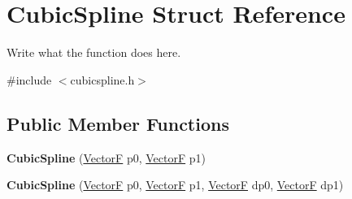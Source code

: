\hypertarget{structCubicSpline}{\section{Cubic\+Spline Struct Reference}
\label{structCubicSpline}
}


Write what the function does here.  




{\ttfamily \#include $<$cubicspline.\+h$>$}

\subsection*{Public Member Functions}
\begin{DoxyCompactItemize}
\item 
\hypertarget{structCubicSpline_ae9889650db27305852f896d03d3bd75c}{{\bfseries Cubic\+Spline} (\hyperlink{structVectorF}{Vector\+F} p0, \hyperlink{structVectorF}{Vector\+F} p1)}\label{structCubicSpline_ae9889650db27305852f896d03d3bd75c}

\item 
\hypertarget{structCubicSpline_a661fd0aed3df6744f52f5ba3872b9251}{{\bfseries Cubic\+Spline} (\hyperlink{structVectorF}{Vector\+F} p0, \hyperlink{structVectorF}{Vector\+F} p1, \hyperlink{structVectorF}{Vector\+F} dp0, \hyperlink{structVectorF}{Vector\+F} dp1)}\label{structCubicSpline_a661fd0aed3df6744f52f5ba3872b9251}


\end{DoxyCompactItemize}
